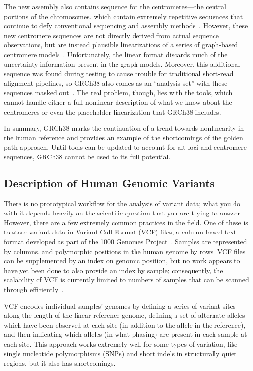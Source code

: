 The new assembly also contains sequence for the centromeres---the central portions of the chromosomes, which contain extremely repetitive sequences that continue to defy conventional sequencing and assembly methods~\cite{karolchik2014new}. However, these new centromere sequences are not directly derived from actual sequence observations, but are instead plausible linearizations of a series of graph-based centromere models~\cite{miga2014centromere}. Unfortunately, the linear format discards much of the uncertainty information present in the graph models. Moreover, this additional sequence was found during testing to cause trouble for traditional short-read alignment pipelines, so GRCh38 also comes as an ``analysis set'' with these sequences masked out~\cite{karolchik2014new}. The real problem, though, lies with the tools, which cannot handle either a full nonlinear description of what we know about the centromeres or even the placeholder linearization that GRCh38 includes.

In summary, GRCh38 marks the continuation of a trend towards nonlinearity in the human reference and provides an example of the shortcomings of the golden path approach. Until tools can be updated to account for alt loci and centromere sequences, GRCh38 cannot be used to its full potential.
    
\subsection{Description of Human Genomic Variants}

There is no prototypical workflow for the analysis of variant data; what you do with it depends heavily on the scientific question that you are trying to answer. However, there are a few extremely common practices in the field. One of these is to store variant data in Variant Call Format (VCF) files, a column-based text format developed as part of the 1000 Genomes Project~\cite{danecek2011variant}. Samples are represented by columns, and polymorphic positions in the human genome by rows. VCF files can be supplemented by an index on genomic position, but no work appears to have yet been done to also provide an index by sample; consequently, the scalability of VCF is currently limited to numbers of samples that can be scanned through efficiently~\cite{danecek2011variant}.

VCF encodes individual samples' genomes by defining a series of variant sites along the length of the linear reference genome, defining a set of alternate alleles which have been observed at each site (in addition to the allele in the reference), and then indicating which alleles (in what phasing) are present in each sample at each site. This approach works extremely well for some types of variation, like single nucleotide polymorphisms (SNPs) and short indels in structurally quiet regions, but it also has shortcomings.

